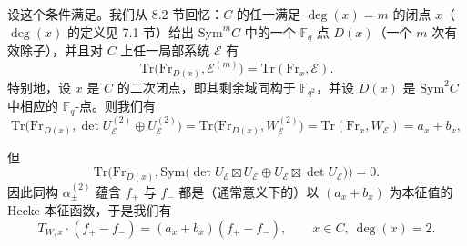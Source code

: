 设这个条件满足。我们从 8.2 节回忆：$C$ 的任一满足 $\deg(x)=m$ 的闭点 $x$（$\deg(x)$ 的定义见 7.1 节）给出 $\mathrm{Sym}^m C$ 中的一个 $\mathbb{F}_q$-点 $D(x)$（一个 $m$ 次有效除子），并且对 $C$ 上任一局部系统 $\mathcal{E}$ 有
\[
\mathrm{Tr}\bigl(\mathrm{Fr}_{D(x)}, \mathcal{E}^{(m)}\bigr) = \mathrm{Tr}(\mathrm{Fr}_x, \mathcal{E}).
\]
特别地，设 $x$ 是 $C$ 的二次闭点，即其剩余域同构于 $\mathbb{F}_{q^2}$，并设 $D(x)$ 是 $\mathrm{Sym}^2 C$ 中相应的 $\mathbb{F}_q$-点。则我们有
\[
\mathrm{Tr}\bigl(\mathrm{Fr}_{D(x)}, \det U_{\mathcal{E}}^{(2)}\oplus U_{\mathcal{E}}^{(2)}\bigr) = \mathrm{Tr}\bigl(\mathrm{Fr}_{D(x)}, W_{\mathcal{E}}^{(2)}\bigr) = \mathrm{Tr}(\mathrm{Fr}_x, W_{\mathcal{E}}) = a_x + b_x,
\]

但
\[
\mathrm{Tr}\bigl(\mathrm{Fr}_{D(x)}, \mathrm{Sym}\bigl(\det U_{\mathcal{E}}\boxtimes U_{\mathcal{E}}\oplus U_{\mathcal{E}}\boxtimes \det U_{\mathcal{E}}\bigr)\bigr) = 0.
\]
因此同构 $\alpha_\pm^{(2)}$ 蕴含 $f_+$ 与 $f_-$ 都是（通常意义下的）以 $(a_x + b_x)$ 为本征值的 Hecke 本征函数，于是我们有
\begin{equation}\tag{8.18}
T_{W,x}\cdot (f_+ - f_-) = (a_x + b_x)(f_+ - f_-), \qquad x\in C,\ \deg(x) = 2.
\end{equation}


